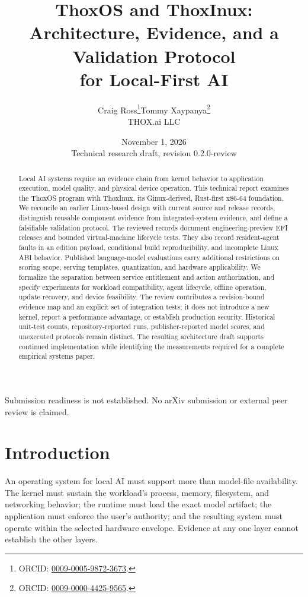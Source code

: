\documentclass[11pt,a4paper]{article}
\title{ThoxOS and ThoxInux:\\Architecture, Evidence, and a Validation Protocol\\for Local-First AI}
\author{Craig Ross\thanks{ORCID: \href{https://orcid.org/0009-0005-9872-3673}{0009-0005-9872-3673}.}\quad Tommy Xaypanya\thanks{ORCID: \href{https://orcid.org/0009-0000-4425-9565}{0009-0000-4425-9565}.}\\THOX.ai LLC}
\date{November 1, 2026\\\small Technical research draft, revision 0.2.0-review}
\begin{document}
\maketitle
\begin{center}\small Submission readiness is not established. No arXiv submission or external peer review is claimed.\end{center}

\begin{abstract}
Local AI systems require an evidence chain from kernel behavior to application execution, model quality, and physical device operation. This technical report examines the ThoxOS program with ThoxInux, its Ginux-derived, Rust-first x86-64 foundation. We reconcile an earlier Linux-based design with current source and release records, distinguish reusable component evidence from integrated-system evidence, and define a falsifiable validation protocol. The reviewed records document engineering-preview EFI releases and bounded virtual-machine lifecycle tests. They also record resident-agent faults in an edition payload, conditional build reproducibility, and incomplete Linux ABI behavior. Published language-model evaluations carry additional restrictions on scoring scope, serving templates, quantization, and hardware applicability. We formalize the separation between service entitlement and action authorization, and specify experiments for workload compatibility, agent lifecycle, offline operation, update recovery, and device feasibility. The review contributes a revision-bound evidence map and an explicit set of integration tests; it does not introduce a new kernel, report a performance advantage, or establish production security. Historical unit-test counts, repository-reported runs, publisher-reported model scores, and unexecuted protocols remain distinct. The resulting architecture draft supports continued implementation while identifying the measurements required for a complete empirical systems paper.
\end{abstract}

\section{Introduction}
An operating system for local AI must support more than model-file availability. The kernel must sustain the workload's process, memory, filesystem, and networking behavior; the runtime must load the exact model artifact; the application must enforce the user's authority; and the resulting system must operate within the selected hardware envelope. Evidence at any one layer cannot establish the other layers.
\end{document}
